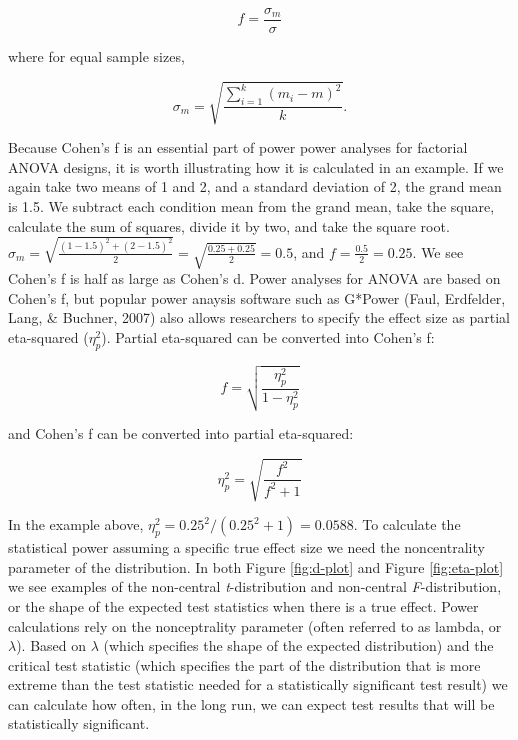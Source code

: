 \documentclass[,man,floatsintext]{apa6}
\begin{document}
\begin{equation}
f = \frac{\sigma _{ m }}{\sigma}
\end{equation}

where for equal sample sizes,

\begin{equation}
\sigma _{ m } = \sqrt { \frac { \sum_ { i = 1 } ^ { k } ( m _ { i } - m ) ^ { 2 } } { k } }.
\end{equation}

Because Cohen's f is an essential part of power power analyses for
factorial ANOVA designs, it is worth illustrating how it is calculated
in an example. If we again take two means of 1 and 2, and a standard
deviation of 2, the grand mean is 1.5. We subtract each condition mean
from the grand mean, take the square, calculate the sum of squares,
divide it by two, and take the square root.
\(\sigma_m = \sqrt{\frac{(1-1.5)^2+(2-1.5)^2}{2}} = \sqrt{\frac{0.25+0.25}{2}} = 0.5\),
and \(f = \frac{0.5}{2} = 0.25.\) We see Cohen's f is half as large as
Cohen's d. Power analyses for ANOVA are based on Cohen's f, but popular
power anaysis software such as G*Power (Faul, Erdfelder, Lang, \&
Buchner, 2007) also allows researchers to specify the effect size as
partial eta-squared (\(\eta_p^2\)). Partial eta-squared can be converted
into Cohen's f:

\begin{equation}
f = \sqrt{\frac{\eta_p^2}{1-\eta_p^2}}
\end{equation}

and Cohen's f can be converted into partial eta-squared:

\begin{equation}
\eta_p^2 = \sqrt{\frac{f^2}{f^2+1}}
\end{equation}

In the example above, \(\eta_p^2 = 0.25^2/(0.25^2+1) = 0.0588\). To
calculate the statistical power assuming a specific true effect size we
need the noncentrality parameter of the distribution. In both Figure
\ref{fig:d-plot} and Figure \ref{fig:eta-plot} we see examples of the
non-central \emph{t}-distribution and non-central \emph{F}-distribution,
or the shape of the expected test statistics when there is a true
effect. Power calculations rely on the nonceptrality parameter (often
referred to as lambda, or \(\lambda\)). Based on \(\lambda\) (which
specifies the shape of the expected distribution) and the critical test
statistic (which specifies the part of the distribution that is more
extreme than the test statistic needed for a statistically significant
test result) we can calculate how often, in the long run, we can expect
test results that will be statistically significant.
\end{document}
